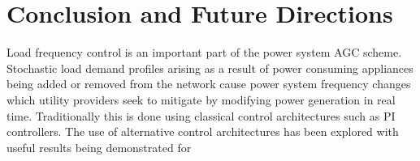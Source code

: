 \chapter{Conclusion and Future Directions}

Load frequency control is an important part of the power system AGC scheme. Stochastic load demand profiles arising as a result of power consuming appliances being added or removed from the network cause power system frequency changes which utility providers seek to mitigate by modifying power generation in real time. Traditionally this is done using classical control architectures such as PI controllers. The use of alternative control architectures has been explored with useful results being demonstrated for  